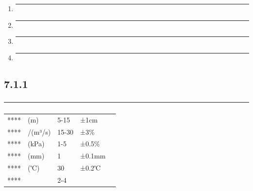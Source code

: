 \begin{enumerate}
\def\labelenumi{\arabic{enumi}.}
\item
  \begin{center}\rule{0.5\linewidth}{0.5pt}\end{center}
\item
  \begin{center}\rule{0.5\linewidth}{0.5pt}\end{center}
\item
  \begin{center}\rule{0.5\linewidth}{0.5pt}\end{center}
\item
  \begin{center}\rule{0.5\linewidth}{0.5pt}\end{center}
\end{enumerate}

\subsection{7.1.1}\label{section-17}

\subsubsection{}\label{section-18}

\begin{center}\rule{0.5\linewidth}{0.5pt}\end{center}

\subsubsection{}\label{section-19}

\begin{longtable}[]{@{}lllll@{}}
\toprule\noalign{}
\endhead
\bottomrule\noalign{}
\endlastfoot
**** & (m) & 5-15 & ±1cm & \\
**** & /(m³/s) & 15-30 & ±3\% & \\
**** & (kPa) & 1-5 & ±0.5\% & \\
**** & (mm) & 1 & ±0.1mm & \\
**** & (℃) & 30 & ±0.2℃ & \\
**** & & 2-4 & & \\
\end{longtable}

\paragraph{}\label{section-20}

